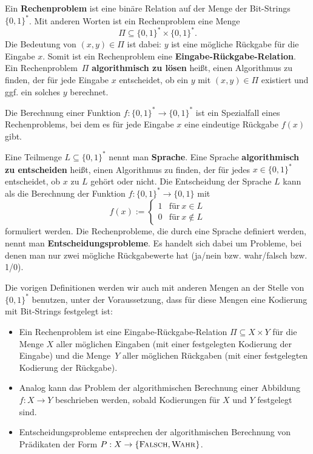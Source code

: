 \begin{defn}
	Ein \textbf{Rechenproblem} ist eine binäre Relation auf der Menge der Bit-Strings $\{0,1\}^\ast$. Mit anderen Worten ist ein Rechenproblem eine Menge 
	\[
	\Pi \subseteq \{0,1\}^\ast \times \{0,1\}^\ast.
	\]
	Die Bedeutung von $(x,y) \in \Pi$ ist dabei: $y$ ist eine mögliche Rückgabe für die Eingabe $x$. Somit ist ein Rechenproblem eine \textbf{Eingabe-Rückgabe-Relation}. Ein Rechenproblem~$\Pi$ \textbf{algorithmisch zu lösen} heißt, einen Algorithmus zu finden, der für jede Eingabe $x$ entscheidet, ob ein $y$ mit $(x,y) \in \Pi$ existiert und ggf. ein solches $y$ berechnet. 
\end{defn} 

\begin{bem}
	Die Berechnung einer Funktion $f : \{0,1\}^\ast \to \{0,1\}^\ast$ ist ein Spezialfall eines Rechenproblems, bei dem es für jede Eingabe $x$ eine eindeutige Rückgabe $f(x)$ gibt. 
\end{bem} 

\begin{defn}
	Eine Teilmenge $L \subseteq \{0,1\}^\ast$ nennt man \textbf{Sprache}. Eine Sprache \textbf{algorithmisch zu entscheiden} heißt, einen Algorithmus zu finden, der für jedes $x \in \{0,1\}^\ast$ entscheidet, ob $x$ zu $L$ gehört oder nicht. Die Entscheidung der Sprache $L$ kann als die Berechnung der Funktion $f : \{0,1\}^\ast \to \{0,1\}$ mit 
	\[
	f(x) := \begin{cases}
		1 & \text{für} \ x \in L
		\\ 0 & \text{für} \ x \not\in L
	\end{cases} 
	\]
	formuliert werden. Die Rechenprobleme, die durch eine Sprache definiert werden, nennt man \textbf{Entscheidungsprobleme}. Es handelt sich dabei um Probleme, bei denen man nur zwei mögliche Rückgabewerte hat (ja/nein bzw. wahr/falsch bzw. 1/0). 
\end{defn}

\begin{bem}
	Die vorigen Definitionen werden wir auch mit anderen Mengen an der Stelle von $\{0,1\}^\ast$ benutzen, unter der Voraussetzung, dass für diese Mengen eine Kodierung mit Bit-Strings festgelegt ist:
	\begin{itemize}
		\item Ein Rechenproblem ist eine Eingabe-Rückgabe-Relation $\Pi \subseteq  X \times Y$ für die Menge $X$ aller möglichen Eingaben (mit einer festgelegten Kodierung der Eingabe) und die Menge~$Y$ aller möglichen Rückgaben (mit einer festgelegten Kodierung der Rückgabe). 
		\item Analog kann das Problem der algorithmischen Berechnung einer Abbildung $f : X \to Y$ beschrieben werden, sobald Kodierungen für $X$ und $Y$ festgelegt sind. 
		\item Entscheidungsprobleme entsprechen der algorithmischen Berechnung von Prädikaten der Form $P : X \to \{\mathop{\text{\textsc{Falsch}}},\mathop{\text{\textsc{Wahr}}}\}$. 
	\end{itemize} 
\end{bem} 

